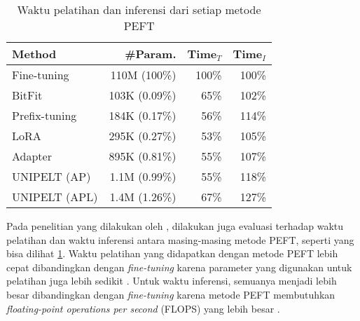 \begin{table}[ht]
    \vspace{0.25cm}
    \centering
    \caption{Waktu pelatihan dan inferensi dari setiap metode PEFT \parencite{unipelt}}
    \label{table:runtime-peft}
    \begin{tabular}{lrrr}
        \toprule
        \textbf{Method} & \textbf{\#Param.} & \textbf{Time$_T$} & \textbf{Time$_I$} \\ 
        \midrule
        Fine-tuning & 110M (100\%) & 100\% & 100\% \\ 
        BitFit & 103K (0.09\%) & 65\% & 102\% \\ 
        Prefix-tuning & 184K (0.17\%) & 56\% & 114\% \\ 
        LoRA & 295K (0.27\%) & 53\% & 105\% \\ 
        Adapter & 895K (0.81\%) & 55\% & 107\% \\ 
        UNIPELT (AP) & 1.1M (0.99\%) & 55\% & 118\% \\ 
        UNIPELT (APL) & 1.4M (1.26\%) & 67\% & 127\% \\ 
        \bottomrule
    \end{tabular}
\end{table}

Pada penelitian yang dilakukan oleh \citeauthor{unipelt}, dilakukan juga evaluasi terhadap waktu pelatihan dan waktu inferensi antara masing-masing metode PEFT, seperti yang bisa dilihat \ref{table:runtime-peft}. Waktu pelatihan yang didapatkan dengan metode PEFT lebih cepat dibandingkan dengan \textit{fine-tuning} karena parameter yang digunakan untuk pelatihan juga lebih sedikit \parencite{unipelt}. Untuk waktu inferensi, semuanya menjadi lebih besar dibandingkan dengan \textit{fine-tuning} karena metode PEFT membutuhkan \textit{floating-point operations per second} (FLOPS) yang lebih besar \parencite{unipelt}.
